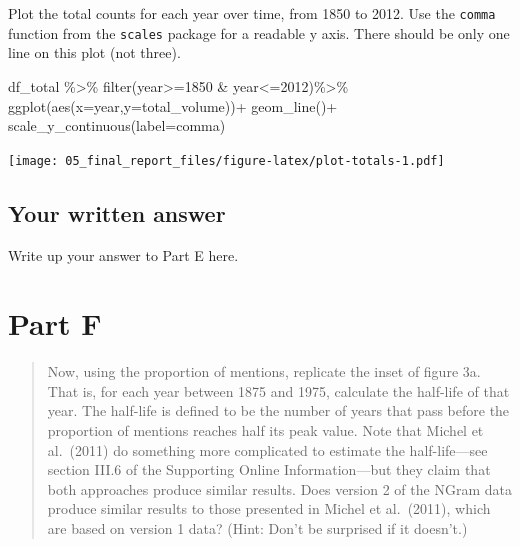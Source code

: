 \documentclass[
]{article}
\newenvironment{Shaded}{\begin{snugshade}}{\end{snugshade}}
\newcommand{\AttributeTok}[1]{\textcolor[rgb]{0.77,0.63,0.00}{#1}}
\newcommand{\DecValTok}[1]{\textcolor[rgb]{0.00,0.00,0.81}{#1}}
\newcommand{\FunctionTok}[1]{\textcolor[rgb]{0.00,0.00,0.00}{#1}}
\newcommand{\NormalTok}[1]{#1}
\newcommand{\SpecialCharTok}[1]{\textcolor[rgb]{0.00,0.00,0.00}{#1}}
\begin{document}
Plot the total counts for each year over time, from 1850 to 2012. Use
the \texttt{comma} function from the \texttt{scales} package for a
readable y axis. There should be only one line on this plot (not three).

\begin{Shaded}
\begin{Highlighting}[]
\NormalTok{df\_total }\SpecialCharTok{\%\textgreater{}\%}
  \FunctionTok{filter}\NormalTok{(year}\SpecialCharTok{\textgreater{}=}\DecValTok{1850} \SpecialCharTok{\&}\NormalTok{ year}\SpecialCharTok{\textless{}=}\DecValTok{2012}\NormalTok{)}\SpecialCharTok{\%\textgreater{}\%}
  \FunctionTok{ggplot}\NormalTok{(}\FunctionTok{aes}\NormalTok{(}\AttributeTok{x=}\NormalTok{year,}\AttributeTok{y=}\NormalTok{total\_volume))}\SpecialCharTok{+}
    \FunctionTok{geom\_line}\NormalTok{()}\SpecialCharTok{+}
    \FunctionTok{scale\_y\_continuous}\NormalTok{(}\AttributeTok{label=}\NormalTok{comma)}
\end{Highlighting}
\end{Shaded}

\texttt{[image: 05\_final\_report\_files/figure-latex/plot-totals-1.pdf]}

\hypertarget{your-written-answer-3}{%
\subsection{Your written answer}\label{your-written-answer-3}}

Write up your answer to Part E here.

\hypertarget{part-f}{%
\section{Part F}\label{part-f}}

\begin{quote}
Now, using the proportion of mentions, replicate the inset of figure 3a.
That is, for each year between 1875 and 1975, calculate the half-life of
that year. The half-life is defined to be the number of years that pass
before the proportion of mentions reaches half its peak value. Note that
Michel et al.~(2011) do something more complicated to estimate the
half-life---see section III.6 of the Supporting Online Information---but
they claim that both approaches produce similar results. Does version 2
of the NGram data produce similar results to those presented in Michel
et al.~(2011), which are based on version 1 data? (Hint: Don't be
surprised if it doesn't.)
\end{quote}
\end{document}
